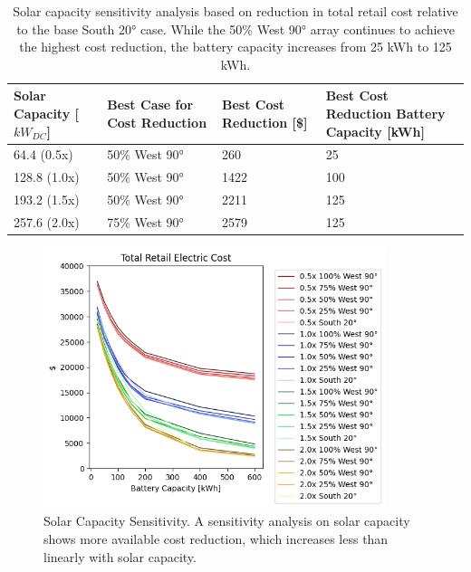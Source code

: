 \documentclass[journal,article,submit,pdftex,moreauthors]{Definitions/mdpi}
\begin{document}
\begin{table}[!h]
  \centering
  \caption{Solar capacity sensitivity analysis based on reduction in total retail cost relative to the base South 20° case. While the 50\% West 90° array continues to achieve the highest cost reduction, the battery capacity increases from 25 kWh to 125 kWh.}
  \label{tab:solar-sensitivity}
  \begin{tabularx}{\textwidth}{XXXX}
    \toprule
    Solar Capacity {[}\(kW_{DC}\){]} & Best Case for Cost Reduction         & Best
    Cost Reduction {[}\${]}          & Best Cost Reduction Battery Capacity
    {[}kWh{]}                                                                            \\
    \midrule
    64.4 (0.5x)                      & 50\% West 90°                        & 260  & 25  \\
    128.8 (1.0x)                     & 50\% West 90°                        & 1422 & 100 \\
    193.2 (1.5x)                     & 50\% West 90°                        & 2211 & 125 \\
    257.6 (2.0x)                     & 75\% West 90°                        & 2579 & 125 \\
    \bottomrule
  \end{tabularx}
\end{table}


\begin{figure}
  \centering
  \includegraphics[width=10cm]{./images/total cost reduction solar sensitivity.png}
  \caption{Solar Capacity Sensitivity. A sensitivity analysis on solar capacity shows more available cost reduction, which increases less than linearly with solar capacity.}
  \label{fig:solar-sensitivity}
\end{figure}
\end{document}
